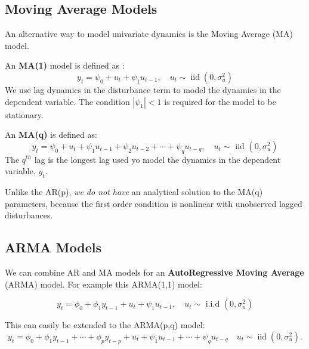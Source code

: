 \documentclass[11pt]{article}
\begin{document}
\subsection{Moving Average Models}

An alternative way to model univariate dynamics is the Moving Average (MA) model. 


\begin{definition}
An \textbf{MA(1)} model is defined as :
\begin{equation}
y_t=\psi_0+u_t+\psi_1 u_{t-1}, \quad u_t \sim \operatorname{iid}\left(0, \sigma_u^2\right)
\end{equation}
We use lag dynamics in the disturbance term to model the dynamics in the dependent variable. The condition $|\psi_1|<1$ is required for the model to be stationary.
\end{definition}


\begin{definition}
    An \textbf{MA(q)} is defined as:
    \begin{equation}
y_t=\psi_0+u_t+\psi_1 u_{t-1}+\psi_2 u_{t-2}+\cdots+\psi_q u_{t-q}, \quad u_t \sim \text { iid }\left(0, \sigma_u^2\right)
\end{equation}
The $q^{th}$ lag is the longest lag used yo model the dynamics in the dependent variable, $y_t$.
\end{definition}

Unlike the AR(p), \textit{we do not have} an analytical solution to the MA(q) parameters, because the first order condition is nonlinear with unobserved lagged disturbances.


\subsection{ARMA Models}

We can combine AR and MA models for an \textbf{AutoRegressive Moving Average} (ARMA) model. For example this ARMA(1,1) model:

\begin{equation}
\label{ARMA(1,1)}
y_t=\phi_0+\phi_1 y_{t-1}+u_t+\psi_1 u_{t-1}, \quad u_t \sim \text { i.i.d }\left(0, \sigma_u^2\right)
\end{equation}

This can easily be extended to the ARMA(p,q) model:
\begin{equation}
y_t=\phi_0+\phi_1 y_{t-1}+\cdots+\phi_p y_{t-p}+u_t+\psi_1 u_{t-1}+\cdots+\psi_q u_{t-q} \quad u_t \sim \operatorname{iid}\left(0, \sigma_u^2\right) .
\end{equation}
\end{document}
